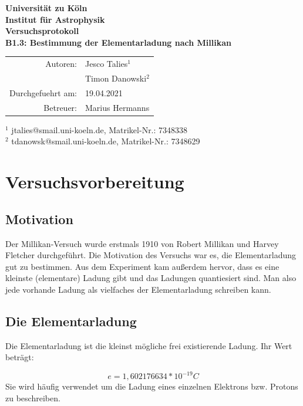 \documentclass{scrartcl}
\begin{document}
\thispagestyle{empty}
\vspace*{\fill}
\begin{center}
	\Huge
	\textbf{Universität zu Köln}\\
	\LARGE
	\textbf{Institut für Astrophysik}\\
	\vspace{2cm}
	\textbf{Versuchsprotokoll}\\
	\vspace{0.5cm}
	\large
	\textbf{B1.3: Bestimmung der Elementarladung nach Millikan}\\
	\normalsize
	\vspace{2cm}
	\begin{tabular}{r l}
		Autoren: 	& Jesco Talies$^1$\\
					& Timon Danowski$^2$\\
		Durchgefuehrt am:	& 19.04.2021\\
		Betreuer:	& Marius Hermanns
	\end{tabular}
\end{center}
\vfill\footnotesize
$^1$ jtalies@smail.uni-koeln.de, Matrikel-Nr.: 7348338\\
$^2$ tdanowsk@smail.uni-koeln.de, Matrikel-Nr.: 7348629\\
\normalsize

\newpage 
\thispagestyle{empty}
\tableofcontents
\clearpage
\setcounter{page}{1}

\section{Versuchsvorbereitung}
	\subsection{Motivation}
		Der Millikan-Versuch wurde erstmals 1910 von Robert Millikan und Harvey Fletcher durchgeführt. Die Motivation des Versuchs war es, die Elementarladung 
		gut zu bestimmen. Aus dem Experiment kam außerdem hervor, dass es eine kleinste (elementare) Ladung gibt und das Ladungen
		quantiesiert sind. Man also jede vorhande Ladung als vielfaches der Elementarladung schreiben kann.
	\subsection{Die Elementarladung}
		Die Elementarladung ist die kleinst mögliche frei existierende Ladung. Ihr Wert beträgt:

			\begin{equation}
				e = 1,602 176 634 * 10^{-19} C
			\end{equation}
		Sie wird häufig verwendet um die Ladung eines einzelnen Elektrons bzw. Protons zu beschreiben.
\end{document}
